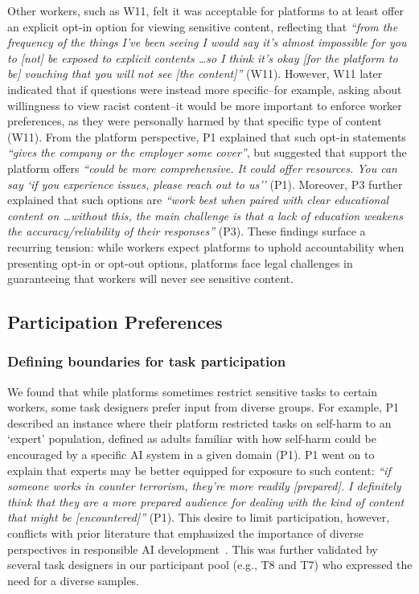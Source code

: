 Other workers, such as W11, felt it was acceptable for platforms to at least offer an explicit opt-in option for viewing sensitive content, reflecting that \textit{``from the frequency of the things I've been seeing I would say it's almost impossible for you to [not] be exposed to explicit contents \dots so I think it's okay [for the platform to be] vouching that you will not see [the content]''} (W11). However, W11 later indicated that if questions were instead more specific--for example, asking about willingness to view racist content--it would be more important to enforce worker preferences, as they were personally harmed by that specific type of content (W11). From the platform perspective, P1 explained that such opt-in statements \textit{``gives the company or the employer some cover''}, but suggested that support the platform offers \textit{``could be more comprehensive. It could offer resources. You can say `if you experience issues, please reach out to us''} (P1). Moreover, P3 further explained that such options are \textit{``work best when paired with clear educational content on \dots without this, the main challenge is that a lack of education weakens the accuracy\slash reliability of their responses''} (P3).
These findings surface a recurring tension: while workers expect platforms to uphold accountability when presenting opt-in or opt-out options, platforms face legal challenges in guaranteeing that workers will never see sensitive content.
 
\subsection{Participation Preferences}
\subsubsection{Defining boundaries for task participation}
We found that while platforms sometimes restrict sensitive tasks to certain workers, some task designers prefer input from diverse groups. For example, P1 described an instance where their platform restricted tasks on self-harm to an `expert' population, defined as adults familiar with how self-harm could be encouraged by a specific AI system in a given domain (P1). P1 went on to explain that experts may be better equipped for exposure to such content: \textit{``if someone works in counter terrorism, they're more readily [prepared]. I definitely think that they are a more prepared audience for dealing with the kind of content that might be [encountered]''} (P1). This desire to limit participation, however, conflicts with prior literature that emphasized the importance of diverse perspectives in responsible AI development~\cite{qian2025locating, dalal2024provocation}. This was further validated by several task designers in our participant pool (e.g., T8 and T7) who expressed the need for a diverse samples. 

